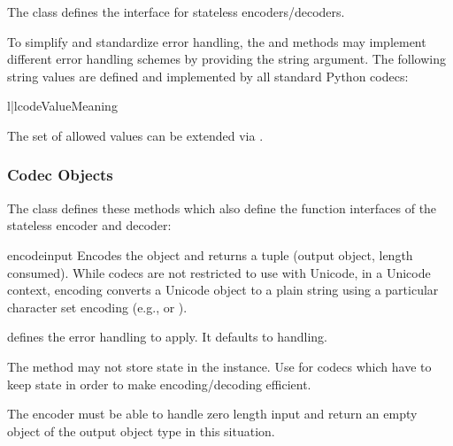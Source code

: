 The  class defines the interface for stateless
encoders/decoders.

To simplify and standardize error handling, the  and
 methods may implement different error handling
schemes by providing the  string argument.  The following
string values are defined and implemented by all standard Python
codecs:

\begin{tableii}{l|l}{code}{Value}{Meaning}
\end{tableii}

The set of allowed values can be extended via .


\subsubsection{Codec Objects \label{codec-objects}}

The  class defines these methods which also define the
function interfaces of the stateless encoder and decoder:

\begin{methoddesc}{encode}{input}
  Encodes the object  and returns a tuple (output object,
  length consumed).  While codecs are not restricted to use with Unicode, in
  a Unicode context, encoding converts a Unicode object to a plain string
  using a particular character set encoding (e.g.,  or
  ).

   defines the error handling to apply. It defaults to
   handling.

  The method may not store state in the  instance. Use
   for codecs which have to keep state in order to
  make encoding/decoding efficient.

  The encoder must be able to handle zero length input and return an
  empty object of the output object type in this situation.
\end{methoddesc}

